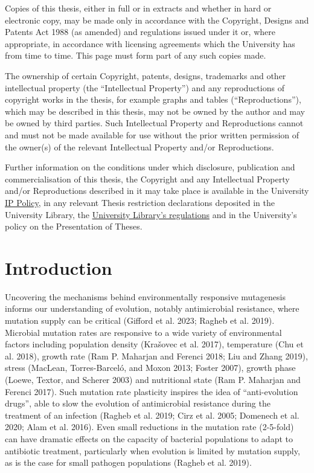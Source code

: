 \documentclass[
  12pt,
  letterpaper,
  DIV=11,
  numbers=noendperiod]{scrreprt}
\begin{document}
Copies of this thesis, either in full or in extracts and whether in hard
or electronic copy, may be made only in accordance with the Copyright,
Designs and Patents Act 1988 (as amended) and regulations issued under
it or, where appropriate, in accordance with licensing agreements which
the University has from time to time. This page must form part of any
such copies made.

The ownership of certain Copyright, patents, designs, trademarks and
other intellectual property (the ``Intellectual Property'') and any
reproductions of copyright works in the thesis, for example graphs and
tables (``Reproductions''), which may be described in this thesis, may
not be owned by the author and may be owned by third parties. Such
Intellectual Property and Reproductions cannot and must not be made
available for use without the prior written permission of the owner(s)
of the relevant Intellectual Property and/or Reproductions.

Further information on the conditions under which disclosure,
publication and commercialisation of this thesis, the Copyright and any
Intellectual Property and/or Reproductions described in it may take
place is available in the University
\href{https://documents.manchester.ac.uk/DocuInfo.aspx?DocID=24420}{IP
Policy}, in any relevant Thesis restriction declarations deposited in
the University Library, the
\href{https://www.library.manchester.ac.uk/about/regulations/}{University
Library's regulations} and in the University's policy on the
Presentation of Theses.


\hypertarget{introduction}{%
\chapter{Introduction}\label{introduction}}

Uncovering the mechanisms behind environmentally responsive mutagenesis
informs our understanding of evolution, notably antimicrobial
resistance, where mutation supply can be critical (Gifford et al. 2023;
Ragheb et al. 2019). Microbial mutation rates are responsive to a wide
variety of environmental factors including population density (Krašovec
et al. 2017), temperature (Chu et al. 2018), growth rate (Ram P.
Maharjan and Ferenci 2018; Liu and Zhang 2019), stress (MacLean,
Torres-Barceló, and Moxon 2013; Foster 2007), growth phase (Loewe,
Textor, and Scherer 2003) and nutritional state (Ram P. Maharjan and
Ferenci 2017). Such mutation rate plasticity inspires the idea of
``anti-evolution drugs'', able to slow the evolution of antimicrobial
resistance during the treatment of an infection (Ragheb et al. 2019;
Cirz et al. 2005; Domenech et al. 2020; Alam et al. 2016). Even small
reductions in the mutation rate (2-5-fold) can have dramatic effects on
the capacity of bacterial populations to adapt to antibiotic treatment,
particularly when evolution is limited by mutation supply, as is the
case for small pathogen populations (Ragheb et al. 2019).
\end{document}
